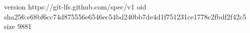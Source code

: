version https://git-lfs.github.com/spec/v1
oid sha256:e68bf6cc74d875556e6546ec54bd240bb7de4d1f751231ce1778c2fbdf2f42c5
size 9881
